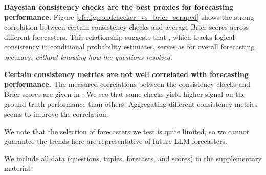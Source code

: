\textbf{Bayesian consistency checks are the best proxies for forecasting performance.}
Figure \ref{cfc:fig:condchecker_vs_brier_scraped} shows the strong correlation between certain consistency checks
and average Brier scores across different forecasters.
This relationship suggests that \CondChecker{}, which tracks logical consistency in conditional probability estimates, serves as  for overall forecasting accuracy, \emph{without knowing how the questions resolved}.


\textbf{Certain consistency metrics are not well correlated with forecasting performance.}
The measured correlations between the consistency checks and Brier scores are given in . We see that some checks yield higher signal on the ground truth performance than others.
Aggregating different consistency metrics seems to improve the correlation.

We note that the selection of forecasters we test is quite limited,
so we cannot guarantee the trends here are representative of future LLM forecasters.

We include all data (questions, tuples, forecasts, and scores) in the supplementary material.


